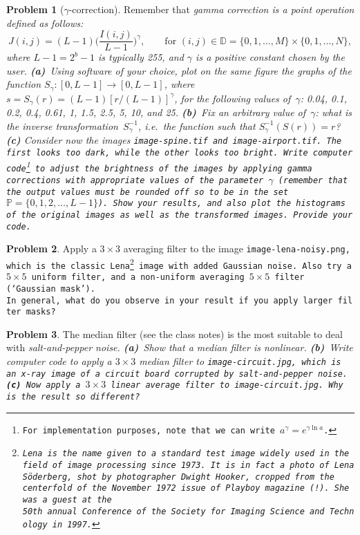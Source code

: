 \documentclass[11pt]{article}
\theoremstyle{plain}
\theoremstyle{definition}
\newtheorem{problem}{Problem}
\theoremstyle{remark}
\begin{document}
\begin{problem}[$\gamma$-correction]
Remember that \em gamma correction \em is
a point operation defined as follows:
$$
J(i,j) = (L-1)\Big(\frac{I(i,j)}{L-1}\Big)^\gamma,
\qquad
\mbox{for }
(i,j)\in\mathbb{D}=
\{0,1,\ldots,M\}
\times
\{0,1,\ldots,N\}, 
$$
where $L-1=2^b-1$ is typically 255, and $\gamma $ is a positive 
constant chosen by the user. 
{\bf(a)}~Using software of your choice, plot on the same figure
the graphs of the function
$S_\gamma:[0,L-1]\rightarrow[0,L-1]$, 
where~$s=S_\gamma(r)=(L-1)[r/(L-1)]^{\gamma}$,
for the following values of~$\gamma$:
0.04, 0.1, 0.2, 0.4, 0.61, 1, 1.5, 2.5, 5, 10, and 25.  
{\bf(b)}~Fix an arbitrary value of~$\gamma$: what is the \em inverse \em transformation~$S_\gamma^{-1}$, i.e.~the function such that
$S_\gamma^{-1}(S(r))=r$? 
{\bf(c)} Consider now the images \tt image-spine.tif \rm and 
\tt image-airport.tif\rm.
The first looks too dark, while the other looks too bright. 
Write computer code\footnote{For implementation purposes, 
note that we can write $a^{\gamma}=e^{\gamma\ln a}$.} 
to adjust the brightness of the images by applying 
gamma corrections with appropriate values of the 
parameter $\gamma$ (remember that the output values must be 
rounded off so to be in the set $\mathbb{P}=\{0,1,2,\ldots,L-1\}$). 
Show your results, and also plot the \em histograms \em of
the original images as well as the transformed images. 
Provide your code.
\end{problem}
\begin{problem}
Apply a $3\times3$ averaging filter to the image
\tt image-lena-noisy.png\rm, which is the classic
Lena\footnote{\em Lena \em is the name given to a standard test image widely used in the field of image processing since 1973. It is in fact a photo of Lena S\"oderberg, shot by photographer Dwight Hooker, cropped from the centerfold of the November 1972 issue of Playboy magazine (!). 
She was a guest at the \mbox{50th annual Conference of the Society for Imaging Science and Technology in 1997.}} image with 
added Gaussian noise. Also try a $5\times5$ uniform filter, and a non-uniform 
averaging $5\times5$ filter (`Gaussian mask').
\mbox{In general, what do you observe in your result if
you apply larger filter masks?}  
\end{problem}
\begin{problem}
The median filter (see the class notes) is the most suitable 
to deal with \em salt-and-pepper \em noise. 
{\bf(a)}~Show that a median filter is \em nonlinear\em\/.
{\bf(b)}~Write computer code to apply a $3\times3$ median filter to \tt image-circuit.jpg\rm, 
which is an x-ray image of a circuit board corrupted by salt-and-pepper
noise. 
{\bf(c)}~Now apply a $3\times3$ linear average filter to \tt image-circuit.jpg\rm. Why is the result so different?
\end{problem}
\end{document}
